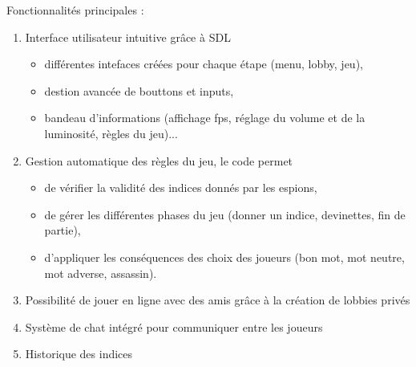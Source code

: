 \documentclass[12pt,a4paper]{article}
\begin{document}
            Fonctionnalités principales :
            \begin{enumerate}
                \item Interface utilisateur intuitive grâce à SDL
                    \begin{itemize}
                        \item différentes intefaces créées pour chaque étape (menu, lobby, jeu),
                        \item destion avancée de bouttons et inputs,
                        \item bandeau d'informations (affichage fps, réglage du volume et de la luminosité, règles du jeu)...
                    \end{itemize}
                \item Gestion automatique des règles du jeu, le code permet  
                    \begin{itemize}
                        \item de vérifier la validité des indices donnés par les espions,
                        \item de gérer les différentes phases du jeu (donner un indice, devinettes, fin de partie),
                        \item d'appliquer les conséquences des choix des joueurs (bon mot, mot neutre, mot adverse, assassin).
                    \end{itemize}
                \item Possibilité de jouer en ligne avec des amis grâce à la création de lobbies privés
                \item Système de chat intégré pour communiquer entre les joueurs
                \item Historique des indices 
            \end{enumerate}

    \newpage
\end{document}
